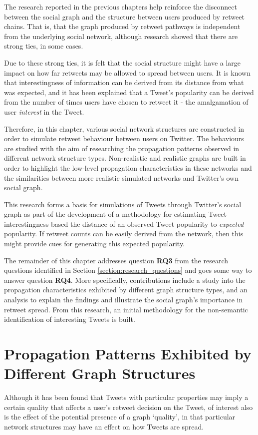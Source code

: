 The research reported in the previous chapters help reinforce the disconnect between the social graph and the structure between users produced by retweet chains. That is, that the graph produced by retweet pathways is independent from the underlying social network, although research showed that there are strong ties, in some cases.

Due to these strong ties, it is felt that the social structure might have a large impact on how far retweets may be allowed to spread between users. It is known that interestingness of information can be derived from its distance from what was expected, and it has been explained that a Tweet's popularity can be derived from the number of times users have chosen to retweet it - the amalgamation of user \textit{interest} in the Tweet.

Therefore, in this chapter, various social network structures are constructed in order to simulate retweet behaviour between users on Twitter. The behaviours are studied with the aim of researching the propagation patterns observed in different network structure types. Non-realistic and realistic graphs are built in order to highlight the low-level propagation characteristics in these networks and the similarities between more realistic simulated networks and Twitter's own social graph. 

This research forms a basis for simulations of Tweets through Twitter's social graph as part of the development of a methodology for estimating Tweet interestingness based the distance of an observed Tweet popularity to \textit{expected} popularity. If retweet counts can be easily derived from the network, then this might provide cues for generating this expected popularity.

The remainder of this chapter addresses question \textbf{RQ3} from the research questions identified in Section \ref{section:research_questions} and goes some way to answer question \textbf{RQ4}. More specifically, contributions include a study into the propagation characteristics exhibited by different graph structure types, and an analysis to explain the findings and illustrate the social graph's importance in retweet spread. From this research, an initial methodology for the non-semantic identification of interesting Tweets is built. 
 

\section{Propagation Patterns Exhibited by Different Graph Structures}
Although it has been found that Tweets with particular properties may imply a certain quality that affects a user's retweet decision on the Tweet, of interest also is the effect of the  potential presence of a graph `quality', in that particular network structures may have an effect on how Tweets are spread.


